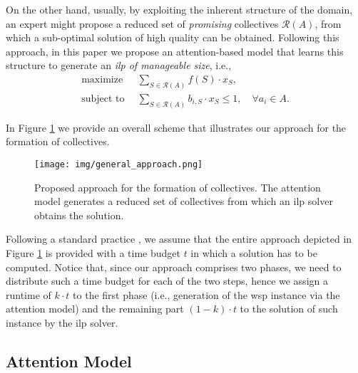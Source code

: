\documentclass{article}
\theoremstyle{definition}
\begin{document}
On the other hand, usually, by exploiting the inherent structure of the domain, an expert might propose a reduced set of \emph{promising} collectives $\mathcal{R}(A)$, from which a sub-optimal solution of high quality can be obtained.
Following this approach, in this paper we propose an attention-based model that learns this structure to generate an  \emph{\gls{ilp} of manageable size}, i.e.,  
\begin{equation}\label{rILP}
\begin{aligned}
    \mbox{maximize} \enspace & \sum_{S \in \mathcal{R}(A)} f(S) \cdot x_S,\\
    \mbox{subject to} \enspace & \sum_{S \in \mathcal{R}(A)} b_{i,S} \cdot x_S \leq 1, \quad  \forall a_i \in A.
\end{aligned}
\end{equation}

In Figure \ref{general_approach} we provide an overall scheme that illustrates our approach for the formation of collectives.

\begin{figure}[ht]
    \centering
    \texttt{[image: img/general\_approach.png]}
    \caption{Proposed approach for the formation of collectives. The attention model generates a reduced set of collectives from which an \gls{ilp} solver obtains the solution.}
    \label{general_approach}
\end{figure}

Following a standard practice \cite{bistaffa2019computational}, we assume that the entire approach depicted in Figure \ref{general_approach} is provided with a time budget $t$ in which a solution has to be computed.
Notice that, since our approach comprises two phases, we need to distribute such a time budget for each of the two steps, hence we assign a runtime of  $k \cdot t$ to the first phase (i.e., generation of the \gls{wsp} instance via the attention model) and the remaining part $(1 - k) \cdot t$ to the solution of such instance by the \gls{ilp} solver.

\subsection{Attention Model}

\end{document}
